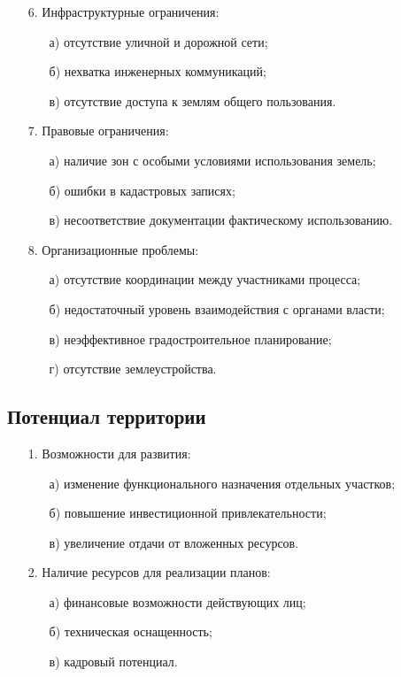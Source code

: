 \begin{enumerate}
\begin{enumerate}
    \end{enumerate}
    \item[6.] Инфраструктурные ограничения:
    \begin{enumerate}
        \item[а)] отсутствие уличной и дорожной сети;
        \item[б)] нехватка инженерных коммуникаций;
        \item[в)] отсутствие доступа к землям общего пользования.
    \end{enumerate}
    \item[7.] Правовые ограничения:
    \begin{enumerate}
        \item[а)] наличие зон с особыми условиями использования земель;
        \item[б)] ошибки в кадастровых записях;
        \item[в)] несоответствие документации фактическому использованию.
    \end{enumerate}
    \item[8.] Организационные проблемы:
    \begin{enumerate}
        \item[а)] отсутствие координации между участниками процесса;
        \item[б)] недостаточный уровень взаимодействия с органами власти;
        \item[в)] неэффективное градостроительное планирование;
        \item[г)] отсутствие землеустройства.
    \end{enumerate}
\end{enumerate}

\subsection{Потенциал территории}
\label{subsec:potenc}

\begin{enumerate}
    \item[1.] Возможности для развития:
    \begin{enumerate}
        \item[а)] изменение функционального назначения отдельных участков;
        \item[б)] повышение инвестиционной привлекательности; 
        \item[в)] увеличение отдачи от вложенных ресурсов.
    \end{enumerate}
    \item[2.] Наличие ресурсов для реализации планов:
    \begin{enumerate}
        \item[а)] финансовые возможности действующих лиц;
        \item[б)] техническая оснащенность;
        \item[в)] кадровый потенциал.
    \end{enumerate}
\end{enumerate}

